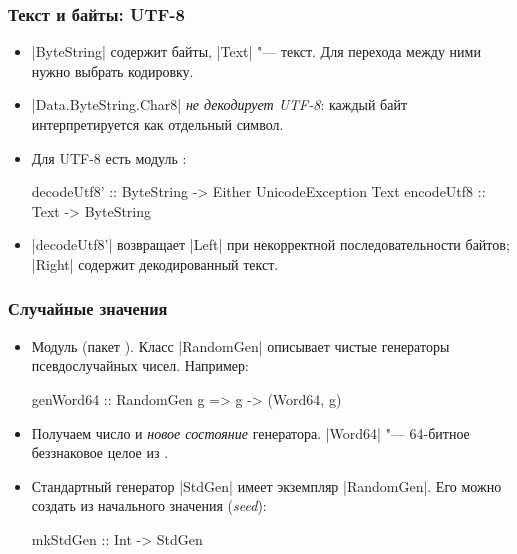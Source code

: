 \documentclass[11pt]{beamer}
\begin{document}
\begin{frame}[fragile]
  \frametitle{Текст и байты: UTF-8}
  \begin{itemize}
    \item \haskinline|ByteString| содержит байты, \haskinline|Text| "--- текст. Для перехода между ними нужно выбрать кодировку.
    \item \haskinline|Data.ByteString.Char8| \emph{не декодирует UTF-8}: каждый байт интерпретируется как отдельный символ.
          \pause
    \item Для UTF-8 есть модуль \href{https://hackage.haskell.org/package/text/docs/Data-Text-Encoding.html}{}:
          \begin{haskellsmall}
            decodeUtf8' :: ByteString ->
              Either UnicodeException Text
            encodeUtf8 :: Text -> ByteString
          \end{haskellsmall}
    \item \haskinline|decodeUtf8'| возвращает \haskinline|Left| при некорректной последовательности байтов; \haskinline|Right| содержит декодированный текст.
  \end{itemize}
\end{frame}

\begin{frame}[fragile]
  \frametitle{Случайные значения}
  \begin{itemize}
    \item Модуль \href{https://hackage.haskell.org/package/random/docs/System-Random.html}{} (пакет ). Класс \haskinline|RandomGen| описывает чистые генераторы псевдослучайных чисел. Например:
          \begin{haskellsmall}
            genWord64 :: RandomGen g => g -> (Word64, g)
          \end{haskellsmall}
    \item Получаем число и \emph{новое состояние} генератора. \haskinline|Word64| "--- 64-битное беззнаковое целое из \href{https://hackage.haskell.org/package/base/docs/Data-Word.html}{}.
    \item Стандартный генератор \haskinline|StdGen| имеет экземпляр \haskinline|RandomGen|. Его можно создать из начального значения (\emph{seed}):
          \begin{haskellsmall}
            mkStdGen :: Int -> StdGen
          \end{haskellsmall}
  \end{itemize}
\end{frame}
\end{document}
